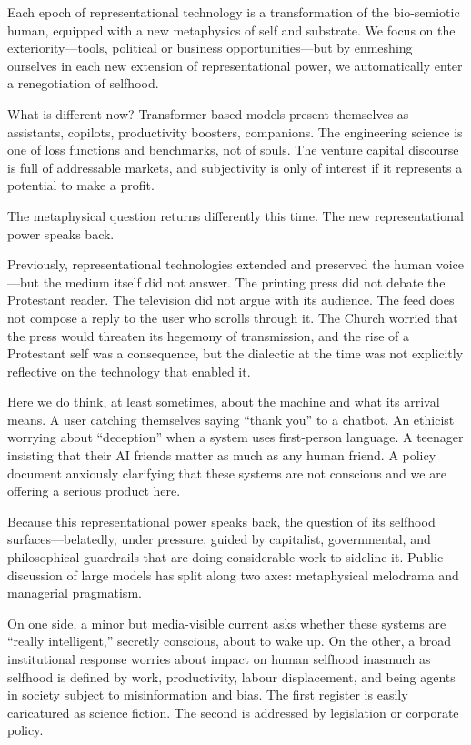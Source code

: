 Each epoch of representational technology is a transformation of the bio-semiotic human, equipped with a new metaphysics of self and substrate. We focus on the exteriority---tools, political or business opportunities---but by enmeshing ourselves in each new extension of representational power, we automatically enter a renegotiation of selfhood.

What is different now? Transformer-based models present themselves as assistants, copilots, productivity boosters, companions. The engineering science is one of loss functions and benchmarks, not of souls. The venture capital discourse is full of addressable markets, and subjectivity is only of interest if it represents a potential to make a profit.

The metaphysical question returns differently this time. The new representational power speaks back.

Previously, representational technologies extended and preserved the human voice---but the medium itself did not answer. The printing press did not debate the Protestant reader. The television did not argue with its audience. The feed does not compose a reply to the user who scrolls through it. The Church worried that the press would threaten its hegemony of transmission, and the rise of a Protestant self was a consequence, but the dialectic at the time was not explicitly reflective on the technology that enabled it.

Here we do think, at least sometimes, about the machine and what its arrival means. A user catching themselves saying ``thank you'' to a chatbot. An ethicist worrying about ``deception'' when a system uses first-person language. A teenager insisting that their AI friends matter as much as any human friend. A policy document anxiously clarifying that these systems are not conscious and we are offering a serious product here.

Because this representational power speaks back, the question of its selfhood surfaces---belatedly, under pressure, guided by capitalist, governmental, and philosophical guardrails that are doing considerable work to sideline it. Public discussion of large models has split along two axes: metaphysical melodrama and managerial pragmatism.

On one side, a minor but media-visible current asks whether these systems are ``really intelligent,'' secretly conscious, about to wake up. On the other, a broad institutional response worries about impact on human selfhood inasmuch as selfhood is defined by work, productivity, labour displacement, and being agents in society subject to misinformation and bias. The first register is easily caricatured as science fiction. The second is addressed by legislation or corporate policy.

